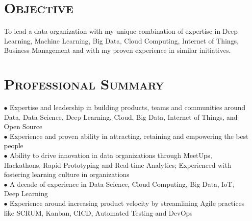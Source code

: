 \begin{resume}


\section{\textsc{Objective}} To lead a data organization with my unique combination of expertise in Deep Learning, Machine Learning, Big Data, Cloud Computing, Internet of Things, Business Management and with my proven experience in similar initiatives.
\section{\textsc{Professional Summary}}
$\bullet$ Expertise and leadership in building products, teams and communities around Data, Data Science, Deep Learning, Cloud, Big Data, Internet of Things, and Open Source\\
$\bullet$ Experience and proven ability in attracting, retaining and empowering the best people \\
$\bullet$ Ability to drive innovation in data organizations through MeetUps, Hackathons, Rapid Prototyping and Real-time Analytics; Experienced with fostering learning culture in organizations\\
$\bullet$ A decade of experience in Data Science, Cloud Computing, Big Data, IoT, Deep Learning\\
$\bullet$ Experience around increasing product velocity by streamlining Agile practices like SCRUM, Kanban, CICD, Automated Testing and DevOps



\end{resume}
